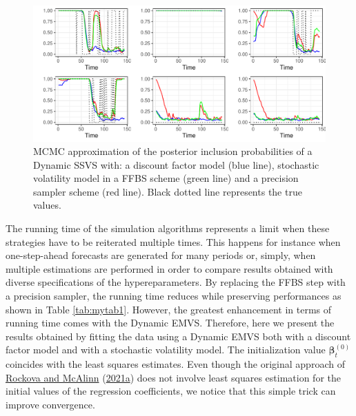 \documentclass[
  12pt,
]{book}
\theoremstyle{break}
\theoremstyle{nonumberplain}
\begin{document}
\begin{figure}[H]

{\centering \includegraphics{Dynamic-Shrinkage-in-Bayesian-Structural-Time-Series-and-Vector-Autoregressive-Models_files/figure-latex/myfig12-1} 

}

\caption{MCMC approximation of the posterior inclusion probabilities of a Dynamic SSVS with: a discount factor model (blue line), stochastic volatility model in a FFBS scheme (green line) and a precision sampler scheme (red line). Black dotted line represents the true values.}\label{fig:myfig12}
\end{figure}

The running time of the simulation algorithms represents a limit when
these strategies have to be reiterated multiple times. This happens for
instance when one-step-ahead forecasts are generated for many periods
or, simply, when multiple estimations are performed in order to compare
results obtained with diverse specifications of the hypereparameters. By
replacing the FFBS step with a precision sampler, the running time
reduces while preserving performances as shown in Table
\ref{tab:mytab1}. However, the greatest enhancement in terms of running
time comes with the Dynamic EMVS. Therefore, here we present the results
obtained by fitting the data using a Dynamic EMVS both with a discount
factor model and with a stochastic volatility model. The initialization
value \(\boldsymbol{\beta}_{t}^{(0)}\) coincides with the least squares
estimates. Even though the original approach of
\protect\hyperlink{ref-rockova_mcalinn_2021}{Rockova and McAlinn}
(\protect\hyperlink{ref-rockova_mcalinn_2021}{2021a}) does not involve
least squares estimation for the initial values of the regression
coefficients, we notice that this simple trick can improve convergence.
\end{document}
